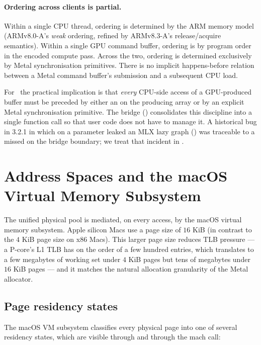 \paragraph{Ordering across clients is partial.} Within a single CPU
thread, ordering is determined by the ARM memory model (ARMv8.0-A's
\emph{weak} ordering, refined by ARMv8.3-A's release/acquire
semantics). Within a single GPU command buffer, ordering is by
program order in the encoded compute pass. Across the two, ordering
is determined exclusively by Metal synchronisation primitives. There
is no implicit happens-before relation between a Metal command
buffer's submission and a subsequent CPU load.

For \Lucid\ the practical implication is that \emph{every} CPU-side
access of a GPU-produced buffer must be preceded by either an
 on the producing array or by an explicit
Metal synchronisation primitive. The  bridge
() consolidates this discipline
into a single function call so that user code does not have to
manage it. A historical bug in 3.2.1 in which  on a
parameter leaked an MLX lazy graph
() was traceable to a missed 
on the bridge boundary; we treat that incident in
.

\section{Address Spaces and the macOS Virtual Memory Subsystem}
\label{sec:unified_memory:vm}

The unified physical pool is mediated, on every access, by the macOS
virtual memory subsystem. Apple silicon Macs use a page size of
\(16\) KiB (in contrast to the \(4\) KiB page size on x86 Macs). This
larger page size reduces TLB pressure --- a P-core's L1 TLB has on
the order of a few hundred entries, which translates to a few
megabytes of working set under \(4\) KiB pages but tens of megabytes
under \(16\) KiB pages --- and it matches the natural allocation
granularity of the Metal allocator.

\subsection{Page residency states}
\label{ssec:unified_memory:residency}

The macOS VM subsystem classifies every physical page into one of
several residency states, which are visible through
 and through the  mach
call:

